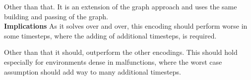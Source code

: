Other than that. It is an extension of the graph approach and uses the same building and passing of the graph.\\

\noindent \textbf{Implications} As it solves over and over, this encoding should perform worse in some timesteps, where the adding of additional timesteps, is required.

Other than that it should, outperform the other encodings. This should hold especially for environments dense in malfunctions, where the worst case assumption should add way to many additional timesteps.